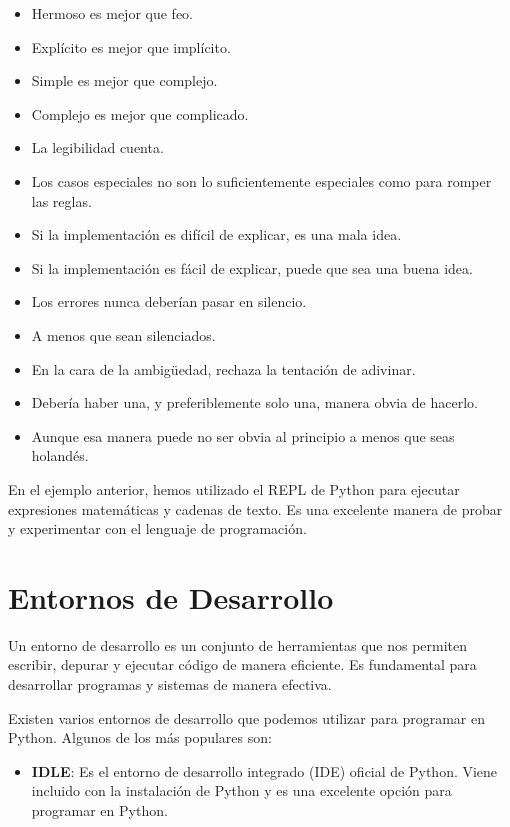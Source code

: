 \documentclass[
  a4paper,
  DIV=11,
  numbers=noendperiod,
  onepage,
  openany]{scrreprt}
\providecommand{\tightlist}{%
  \setlength{\itemsep}{0pt}\setlength{\parskip}{0pt}}\usepackage{longtable,booktabs,array}
\begin{document}
\begin{itemize}
\item
  Hermoso es mejor que feo.
\item
  Explícito es mejor que implícito.
\item
  Simple es mejor que complejo.
\item
  Complejo es mejor que complicado.
\item
  La legibilidad cuenta.
\item
  Los casos especiales no son lo suficientemente especiales como para
  romper las reglas.
\item
  Si la implementación es difícil de explicar, es una mala idea.
\item
  Si la implementación es fácil de explicar, puede que sea una buena
  idea.
\item
  Los errores nunca deberían pasar en silencio.
\item
  A menos que sean silenciados.
\item
  En la cara de la ambigüedad, rechaza la tentación de adivinar.
\item
  Debería haber una, y preferiblemente solo una, manera obvia de
  hacerlo.
\item
  Aunque esa manera puede no ser obvia al principio a menos que seas
  holandés.
\end{itemize}

En el ejemplo anterior, hemos utilizado el REPL de Python para ejecutar
expresiones matemáticas y cadenas de texto. Es una excelente manera de
probar y experimentar con el lenguaje de programación.

\section{Entornos de Desarrollo}\label{entornos-de-desarrollo}

Un entorno de desarrollo es un conjunto de herramientas que nos permiten
escribir, depurar y ejecutar código de manera eficiente. Es fundamental
para desarrollar programas y sistemas de manera efectiva.

Existen varios entornos de desarrollo que podemos utilizar para
programar en Python. Algunos de los más populares son:

\begin{itemize}
\tightlist
\item
  \textbf{IDLE}: Es el entorno de desarrollo integrado (IDE) oficial de
  Python. Viene incluido con la instalación de Python y es una excelente
  opción para programar en Python.
\end{itemize}
\end{document}
